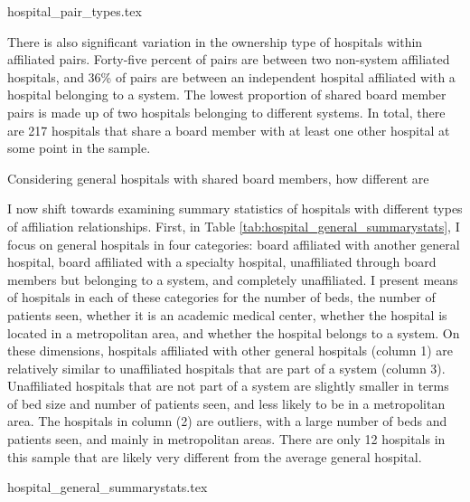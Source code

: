 \documentclass[12pt]{article}
\begin{document}
    {hospital_pair_types.tex}
    
    There is also significant variation in the ownership type of hospitals within affiliated pairs. Forty-five percent of pairs are between two non-system affiliated hospitals, and 36\% of pairs are between an independent hospital affiliated with a hospital belonging to a system. The lowest proportion of shared board member pairs is made up of two hospitals belonging to different systems. In total, there are 217 hospitals that share a board member with at least one other hospital at some point in the sample. 

    Considering general hospitals with shared board members, how different are


    I now shift towards examining summary statistics of hospitals with different types of affiliation relationships. First, in Table \ref{tab:hospital_general_summarystats}, I focus on general hospitals in four categories: board affiliated with another general hospital, board affiliated with a specialty hospital, unaffiliated through board members but belonging to a system, and completely unaffiliated. I present means of hospitals in each of these categories for the number of beds, the number of patients seen, whether it is an academic medical center, whether the hospital is located in a metropolitan area, and whether the hospital belongs to a system. On these dimensions, hospitals affiliated with other general hospitals (column 1) are relatively similar to unaffiliated hospitals that are part of a system (column 3). Unaffiliated hospitals that are not part of a system are slightly smaller in terms of bed size and number of patients seen, and less likely to be in a metropolitan area. The hospitals in column (2) are outliers, with a large number of beds and patients seen, and mainly in metropolitan areas. There are only 12 hospitals in this sample that are likely very different from the average general hospital. 

    {hospital_general_summarystats.tex}
\end{document}
